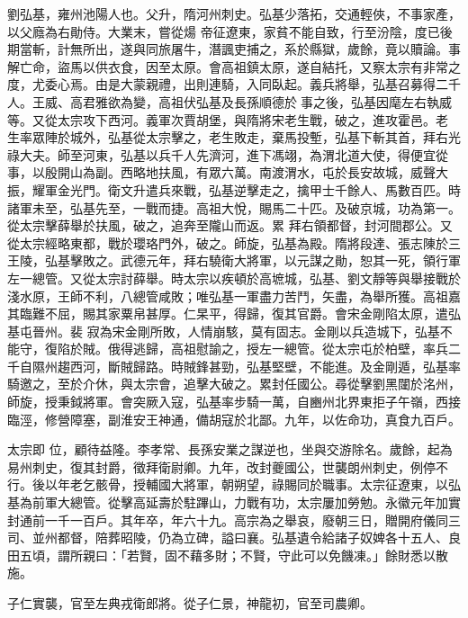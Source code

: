 \begin{pinyinscope}
 劉弘基，雍州池陽人也。父升，隋河州刺史。弘基少落拓，交通輕俠，不事家產，以父廕為右勛侍。大業末，嘗從煬
 帝征遼東，家貧不能自致，行至汾陰，度已後期當斬，計無所出，遂與同旅屠牛，潛諷吏捕之，系於縣獄，歲餘，竟以贖論。事解亡命，盜馬以供衣食，因至太原。會高祖鎮太原，遂自結托，又察太宗有非常之度，尤委心焉。由是大蒙親禮，出則連騎，入同臥起。義兵將舉，弘基召募得二千人。王威、高君雅欲為變，高祖伏弘基及長孫順德於事之後，弘基因麾左右執威等。又從太宗攻下西河。義軍次賈胡堡，與隋將宋老生戰，破之，進攻霍邑。老
 生率眾陣於城外，弘基從太宗擊之，老生敗走，棄馬投塹，弘基下斬其首，拜右光祿大夫。師至河東，弘基以兵千人先濟河，進下馮翊，為渭北道大使，得便宜從事，以殷開山為副。西略地扶風，有眾六萬。南渡渭水，屯於長安故城，威聲大振，耀軍金光門。衛文升遣兵來戰，弘基逆擊走之，擒甲士千餘人、馬數百匹。時諸軍未至，弘基先至，一戰而捷。高祖大悅，賜馬二十匹。及破京城，功為第一。從太宗擊薛舉於扶風，破之，追奔至隴山而返。累
 拜右領都督，封河間郡公。又從太宗經略東都，戰於瓔珞門外，破之。師旋，弘基為殿。隋將段達、張志陳於三王陵，弘基擊敗之。武德元年，拜右驍衛大將軍，以元謀之勛，恕其一死，領行軍左一總管。又從太宗討薛舉。時太宗以疾頓於高墌城，弘基、劉文靜等與舉接戰於淺水原，王師不利，八總管咸敗；唯弘基一軍盡力苦鬥，矢盡，為舉所獲。高祖嘉其臨難不屈，賜其家粟帛甚厚。仁杲平，得歸，復其官爵。會宋金剛陷太原，遣弘基屯晉州。裴
 寂為宋金剛所敗，人情崩駭，莫有固志。金剛以兵造城下，弘基不能守，復陷於賊。俄得逃歸，高祖慰諭之，授左一總管。從太宗屯於柏壁，率兵二千自隰州趨西河，斷賊歸路。時賊鋒甚勁，弘基堅壁，不能進。及金剛遁，弘基率騎邀之，至於介休，與太宗會，追擊大破之。累封任國公。尋從擊劉黑闥於洺州，師旋，授秉鉞將軍。會突厥入寇，弘基率步騎一萬，自豳州北界東拒子午嶺，西接臨涇，修營障塞，副淮安王神通，備胡寇於北鄙。九年，以佐命功，真食九百戶。



 太宗即
 位，顧待益隆。李孝常、長孫安業之謀逆也，坐與交游除名。歲餘，起為易州刺史，復其封爵，徵拜衛尉卿。九年，改封夔國公，世襲朗州刺史，例停不行。後以年老乞骸骨，授輔國大將軍，朝朔望，祿賜同於職事。太宗征遼東，以弘基為前軍大總管。從擊高延壽於駐蹕山，力戰有功，太宗屢加勞勉。永徽元年加實封通前一千一百戶。其年卒，年六十九。高宗為之舉哀，廢朝三日，贈開府儀同三司、並州都督，陪葬昭陵，仍為立碑，謚曰襄。弘基遺令給諸子奴婢各十五人、良田五頃，謂所親曰：「若賢，固不藉多財；不賢，守此可以免饑凍。」餘財悉以散施。



 子仁實襲，官至左典戎衛郎將。從子仁景，神龍初，官至司農卿。




\end{pinyinscope}
